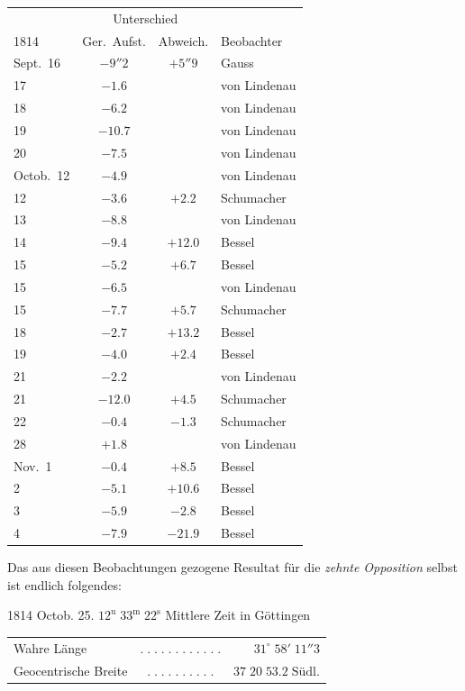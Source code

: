 \begin{center}
\fontsize{10}{12}\selectfont\setlength{\tabcolsep}{5pt}\renewcommand{\arraystretch}{1.15}\begin{tabular}{l|cc|l}
 & \multicolumn{2}{c|}{Unterschied} & \\
1814 & Ger.\ Aufst. & Abweich. & Beobachter \\
\hline
Sept.\ 16 & $-9''2$ & $+5''9$ & Gauss \\
17 & $-1.6$ & & von Lindenau \\
18 & $-6.2$ & & von Lindenau \\
19 & $-10.7$ & & von Lindenau \\
20 & $-7.5$ & & von Lindenau \\
Octob.\ 12 & $-4.9$ & & von Lindenau \\
12 & $-3.6$ & $+2.2$ & Schumacher \\
13 & $-8.8$ & & von Lindenau \\
14 & $-9.4$ & $+12.0$ & Bessel \\
15 & $-5.2$ & $+6.7$ & Bessel \\
15 & $-6.5$ & & von Lindenau \\
15 & $-7.7$ & $+5.7$ & Schumacher \\
18 & $-2.7$ & $+13.2$ & Bessel \\
19 & $-4.0$ & $+2.4$ & Bessel \\
21 & $-2.2$ & & von Lindenau \\
21 & $-12.0$ & $+4.5$ & Schumacher \\
22 & $-0.4$ & $-1.3$ & Schumacher \\
28 & $+1.8$ & & von Lindenau \\
Nov.\ 1 & $-0.4$ & $+8.5$ & Bessel \\
2 & $-5.1$ & $+10.6$ & Bessel \\
3 & $-5.9$ & $-2.8$ & Bessel \\
4 & $-7.9$ & $-21.9$ & Bessel \\
\end{tabular}
\end{center}

\par\indent Das aus diesen Beobachtungen gezogene Resultat für die \emph{zehnte Opposition} selbst ist endlich folgendes:

\begin{center}1814 Octob. 25. $12^{\mathrm u}\;33^{\mathrm m}\;22^{\mathrm s}$ Mittlere Zeit in Göttingen\end{center}
\begin{center}\fontsize{10}{12}\selectfont\setlength{\tabcolsep}{3pt}\renewcommand{\arraystretch}{1.15}\begin{tabular}{lcr}
Wahre Länge & $.\;.\;.\;.\;.\;.\;.\;.\;.\;.\;.\;.$ & $31^\circ\;58'\;11''3$\\
Geocentrische Breite & $.\;.\;.\;.\;.\;.\;.\;.\;.\;.$ & $37\;20\;53.2\;\mathrm{Südl.}$\\
\end{tabular}\end{center}

